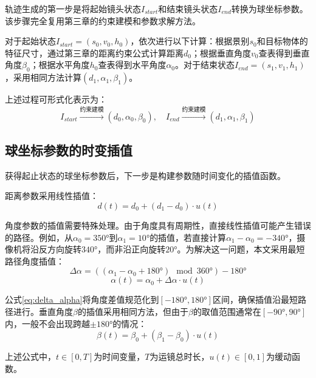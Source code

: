 轨迹生成的第一步是将起始镜头状态$I_{start}$和结束镜头状态$I_{end}$转换为球坐标参数。该步骤完全复用第三章的约束建模和参数求解方法。

对于起始状态$I_{start} = (s_0, v_0, h_0)$，依次进行以下计算：根据景别$s_0$和目标物体的特征尺寸，通过第三章的距离约束公式计算距离$d_0$；根据垂直角度$v_0$查表得到垂直角度$\beta_0$；根据水平角度$h_0$查表得到水平角度$\alpha_0$。对于结束状态$I_{end} = (s_1, v_1, h_1)$，采用相同方法计算$(d_1, \alpha_1, \beta_1)$。

上述过程可形式化表示为：
\begin{equation}
I_{start} \xrightarrow{\text{约束建模}} (d_0, \alpha_0, \beta_0), \quad I_{end} \xrightarrow{\text{约束建模}} (d_1, \alpha_1, \beta_1)
\end{equation}

\subsection{球坐标参数的时变插值}

获得起止状态的球坐标参数后，下一步是构建参数随时间变化的插值函数。

距离参数采用线性插值：
\begin{equation}
d(t) = d_0 + (d_1 - d_0) \cdot u(t)
\label{eq:d_interp}
\end{equation}

角度参数的插值需要特殊处理。由于角度具有周期性，直接线性插值可能产生错误的路径。例如，从$\alpha_0 = 350°$到$\alpha_1 = 10°$的插值，若直接计算$\alpha_1 - \alpha_0 = -340°$，摄像机将沿反方向旋转$340°$，而非沿正向旋转$20°$。为解决这一问题，本文采用最短路径角度插值：
\begin{equation}
\Delta\alpha = ((\alpha_1 - \alpha_0 + 180°) \mod 360°) - 180°
\label{eq:delta_alpha}
\end{equation}
\begin{equation}
\alpha(t) = \alpha_0 + \Delta\alpha \cdot u(t)
\label{eq:alpha_interp}
\end{equation}

公式\ref{eq:delta_alpha}将角度差值规范化到$[-180°, 180°]$区间，确保插值沿最短路径进行。垂直角度$\beta$的插值采用相同方法，但由于$\beta$的取值范围通常在$[-90°, 90°]$内，一般不会出现跨越$\pm 180°$的情况：
\begin{equation}
\beta(t) = \beta_0 + (\beta_1 - \beta_0) \cdot u(t)
\label{eq:beta_interp}
\end{equation}

上述公式中，$t \in [0, T]$为时间变量，$T$为运镜总时长，$u(t) \in [0, 1]$为缓动函数。

